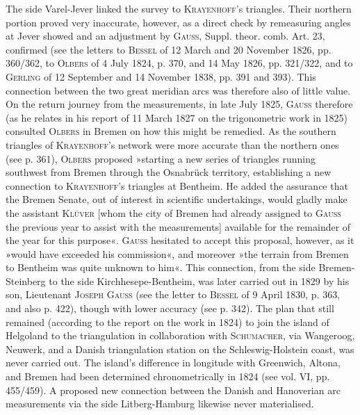 \par\noindent\hspace*{\parindent}The side Varel-Jever linked the survey to \textsc{Krayenhoff}'s triangles. Their northern portion proved very inaccurate, however, as a direct check by remeasuring angles at Jever showed and an adjustment by \textsc{Gauss}, Suppl. theor. comb. Art. 23, confirmed (see the letters to \textsc{Bessel} of 12 March and 20 November 1826, pp. 360/362, to \textsc{Olbers} of 4 July 1824, p. 370, and 14 May 1826, pp. 321/322, and to \textsc{Gerling} of 12 September and 14 November 1838, pp. 391 and 393). This connection between the two great meridian arcs was therefore also of little value. On the return journey from the measurements, in late July 1825, \textsc{Gauss} therefore (as he relates in his report of 11 March 1827 on the trigonometric work in 1825) consulted \textsc{Olbers} in Bremen on how this might be remedied. As the southern triangles of \textsc{Krayenhoff}'s network were more accurate than the northern ones (see p. 361), \textsc{Olbers} proposed »starting a new series of triangles running southwest from Bremen through the Osnabrück territory, establishing a new connection to \textsc{Krayenhoff}'s triangles at Bentheim. He added the assurance that the Bremen Senate, out of interest in scientific undertakings, would gladly make the assistant \textsc{Klüver} [whom the city of Bremen had already assigned to \textsc{Gauss} the previous year to assist with the measurements] available for the remainder of the year for this purpose«. \textsc{Gauss} hesitated to accept this proposal, however, as it »would have exceeded his commission«, and moreover »the terrain from Bremen to Bentheim was quite unknown to him«. This connection, from the side Bremen-Steinberg to the side Kirchhesepe-Bentheim, was later carried out in 1829 by his son, Lieutenant \textsc{Joseph Gauss} (see the letter to \textsc{Bessel} of 9 April 1830, p. 363, and also p. 422), though with lower accuracy (see p. 342). The plan that still remained (according to the report on the work in 1824) to join the island of Helgoland to the triangulation in collaboration with \textsc{Schumacher}, via Wangeroog, Neuwerk, and a Danish triangulation station on the Schleswig-Holstein coast, was never carried out. The island's difference in longitude with Greenwich, Altona, and Bremen had been determined chronometrically in 1824 (see vol. VI, pp. 455/459). A proposed new connection between the Danish and Hanoverian arc measurements via the side Litberg-Hamburg likewise never materialised.

